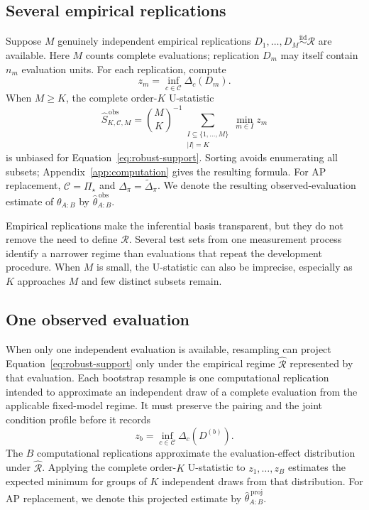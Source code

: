 \documentclass[11pt]{article}
\newcommand{\Regime}{\mathcal{R}}
\newcommand{\CSet}{\mathcal{C}}
\newcommand{\PSet}{\Pi_\star}
\newcommand{\iid}{\mathrel{\overset{\mathrm{iid}}{\sim}}}
\newcommand{\Dta}{\widetilde{\Delta}}
\theoremstyle{remark}
\begin{document}
\subsection{Several empirical replications}

Suppose $M$ genuinely independent empirical replications $D_1,\ldots,D_M\iid\Regime$ are available. Here $M$ counts complete evaluations; replication $D_m$ may itself contain $n_m$ evaluation units. For each replication, compute
\[
z_m
=
\inf_{c\in\CSet}\Delta_c(D_m).
\]
When $M\geq K$, the complete order-$K$ U-statistic \cite{hoeffding1948ustat}
\begin{equation}
\widehat S_{K,\CSet,M}^{\,\mathrm{obs}}
=
\binom MK^{-1}
\sum_{\substack{I\subseteq\{1,\ldots,M\}\\|I|=K}}
\min_{m\in I}z_m
\label{eq:observed-u}
\end{equation}
is unbiased for Equation~\eqref{eq:robust-support}. Sorting avoids enumerating all subsets; Appendix~\ref{app:computation} gives the resulting formula. For AP replacement, $\CSet=\PSet$ and $\Delta_\pi=\Dta_\pi$. We denote the resulting observed-evaluation estimate of $\theta_{A:B}$ by $\widehat\theta_{A:B}^{\,\mathrm{obs}}$.

Empirical replications make the inferential basis transparent, but they do not remove the need to define $\Regime$. Several test sets from one measurement process identify a narrower regime than evaluations that repeat the development procedure. When $M$ is small, the U-statistic can also be imprecise, especially as $K$ approaches $M$ and few distinct subsets remain.

\subsection{One observed evaluation}

When only one independent evaluation is available, resampling can project Equation~\eqref{eq:robust-support} only under the empirical regime $\widehat{\Regime}$ represented by that evaluation. Each bootstrap resample is one computational replication intended to approximate an independent draw of a complete evaluation from the applicable fixed-model regime. It must preserve the pairing and the joint condition profile before it records
\[
z_b
=
\inf_{c\in\CSet}\Delta_c(D^{(b)}).
\]
The $B$ computational replications approximate the evaluation-effect distribution under $\widehat{\Regime}$. Applying the complete order-$K$ U-statistic to $z_1,\ldots,z_B$ estimates the expected minimum for groups of $K$ independent draws from that distribution. For AP replacement, we denote this projected estimate by $\widehat\theta_{A:B}^{\,\mathrm{proj}}$.
\end{document}
